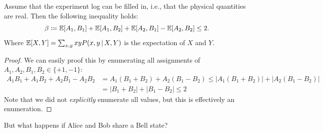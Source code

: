 		\begin{theorem}
			Assume that the experiment log can be filled in, i.e., that the physical quantities are real. Then the following inequality holds:
			\begin{equation}
				\beta \coloneqq \mathbb{E}[A_1, B_1] + \mathbb{E}[A_1, B_2] + \mathbb{E}[A_2, B_1] - \mathbb{E}[A_2, B_2] \leq 2.
			\end{equation}
			Where \( \mathbb{E}[X, Y] = \sum_{x, y} x y P(x, y \,\vert\, X, Y) \) is the expectation of \(X\) and \(Y\).
		\end{theorem}
		\begin{proof}
			We can easily proof this by enumerating all assignments of \( A_1, A_2, B_1, B_2 \in \{ +1, -1 \} \):
			\begin{align}
				A_1 B_1 + A_1 B_2 + A_2 B_1 - A_2 B_2
					&= A_1 (B_1 + B_2) + A_2 (B_1 - B_2)
					 \leq \bigl\lvert A_1 (B_1 + B_2) \bigr\rvert + \bigl\lvert A_2 (B_1 - B_2) \bigr\rvert \\
					&= \bigl\lvert B_1 + B_2 \bigr\rvert + \bigl\lvert B_1 - B_2 \bigr\rvert
					 \leq 2
			\end{align}
			Note that we did not \emph{explicitly} enumerate all values, but this is effectively an enumeration.
		\end{proof}
		But what happens if Alice and Bob share a Bell state?

